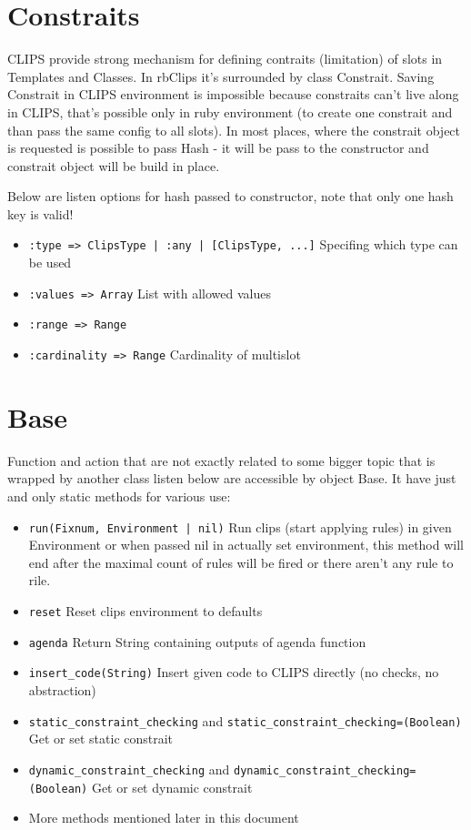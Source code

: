 \documentclass[a4paper,10pt]{article}
\begin{document}
\section{Constraits}
CLIPS provide strong mechanism for defining contraits (limitation) of slots in Templates and Classes. In rbClips it's surrounded by class Constrait. Saving Constrait in CLIPS environment is impossible because constraits can't live along in CLIPS, that's possible only in ruby environment (to create one constrait and than pass the same config to all slots). In most places, where the constrait object is requested is possible to pass Hash - it will be pass to the constructor and constrait object will be build in place.

Below are listen options for hash passed to constructor, note that only one hash key is valid!
\begin{itemize}
 \item \texttt{:type => ClipsType | :any | [ClipsType, ...]} Specifing which type can be used
 \item \texttt{:values => Array} List with allowed values
 \item \texttt{:range => Range}
 \item \texttt{:cardinality => Range} Cardinality of multislot
\end{itemize}

\section{Base}
Function and action that are not exactly related to some bigger topic that is wrapped by another class listen below are accessible by object Base. It have just and only static methods for various use:
\begin{itemize}
 \item \texttt{run(Fixnum, Environment | nil)} Run clips (start applying rules) in given Environment or when passed nil in actually set environment, this method will end after the maximal count of rules will be fired or there aren't any rule to rile.
 \item \texttt{reset} Reset clips environment to defaults
 \item \texttt{agenda} Return String containing outputs of agenda function
 \item \texttt{insert\_code(String)} Insert given code to CLIPS directly (no checks, no abstraction)
 \item \texttt{static\_constraint\_checking} and \texttt{static\_constraint\_checking=(Boolean)} Get or set static constrait
 \item \texttt{dynamic\_constraint\_checking} and \texttt{dynamic\_constraint\_checking=(Boolean)} Get or set dynamic constrait
 \item More methods mentioned later in this document
\end{itemize}
\end{document}
